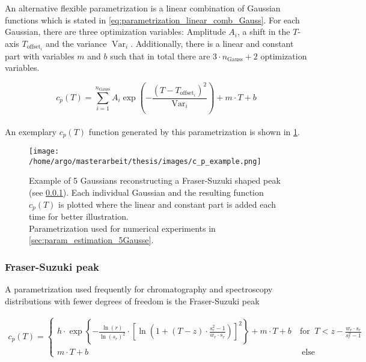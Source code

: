 \documentclass{scrartcl}[12pt, halfparskip]
\numberwithin{equation}{section}
\numberwithin{figure}{section}
\numberwithin{table}{section}
\newcommand{\var}{\operatorname{Var}}
\begin{document}
An alternative flexible parametrization is a linear combination of Gaussian functions which is stated in \cref{eq:parametrization_linear_comb_Gauss}. For each Gaussian, there are three optimization variables: Amplitude $A_i$, a shift in the $T$-axis $T_{\text{offset}_i}$ and the variance $\var_i$. Additionally, there is a linear and constant part with variables $m$ and $b$ such that in total there are $3 \cdot n_{\text{Gauss}} + 2$ optimization variables. 

\begin{equation}
c_p(T) = \sum_{i=1}^{n_{\text{Gauss}}} A_i \exp\left(- \frac{(T - T_{\text{offset}_i})^2}{{\var}_i}\right) + m \cdot T + b
\label{eq:parametrization_linear_comb_Gauss}
\end{equation} \\

An exemplary $c_p(T)$ function generated by this parametrization is shown in \cref{fig:parametrization_example_linear_comb_gauss}.


\begin{figure}[H]
	\centering
	\texttt{[image: /home/argo/masterarbeit/thesis/images/c\_p\_example.png]}
	\caption{Example of 5 Gaussians reconstructing a Fraser-Suzuki shaped peak (see \cref{sec:parametrization_FS}). Each individual Gaussian and  the resulting function $c_p(T)$ is plotted where the linear and constant part is added each time for better illustration. \\
	Parametrization used for numerical experiments in \cref{sec:param_estimation_5Gausse}.}
	\label{fig:parametrization_example_linear_comb_gauss}
\end{figure}



\subsubsection{Fraser-Suzuki peak}
\label{sec:parametrization_FS}

A parametrization used frequently for chromatography and spectroscopy distributions with fewer degrees of freedom is the Fraser-Suzuki peak \cite{fraser_suzuki_1} \cite{fraser_suzuki_many_fcts}

\begin{align}
	c_p(T) =
	\begin{cases}
		h \cdot \exp \left\{ - \frac{\ln(r)}{\ln(s_r)^2} \cdot \left[ \ln\left( 1 + (T-z) \cdot \frac{s_r^2 - 1}{w_r \cdot s_r} \right) \right]^2 \right\} + m \cdot T + b \ & \text{for } \ T < z - \frac{w_r \cdot s_r}{s_r^2 - 1} \\
		m \cdot T + b \ & \ \text{else}
	\end{cases}
	\label{eq:fraser_suzuki}
\end{align}
\end{document}
